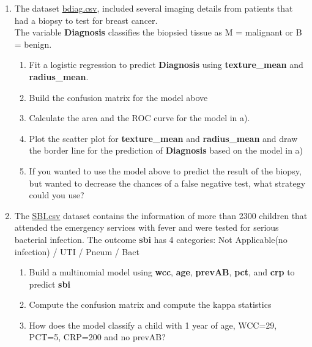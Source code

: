 \documentclass[
]{book}
\begin{document}
\begin{enumerate}
\def\labelenumi{\arabic{enumi})}
\item
  The dataset \href{https://www.dropbox.com/s/vp44yozebx5xgok/bdiag.csv?dl=1}{bdiag.csv},
  included several imaging details from patients that had a biopsy to test for
  breast cancer.\\
  The variable \textbf{Diagnosis} classifies the biopsied tissue as M = malignant or
  B = benign.

  \begin{enumerate}
  \def\labelenumii{\alph{enumii})}
  \item
    Fit a logistic regression to predict \textbf{Diagnosis} using \textbf{texture\_mean}
    and \textbf{radius\_mean}.
  \item
    Build the confusion matrix for the model above
  \item
    Calculate the area and the ROC curve for the model in a).
  \item
    Plot the scatter plot for \textbf{texture\_mean}
    and \textbf{radius\_mean} and draw the border line for the prediction of
    \textbf{Diagnosis} based on the model in a)
  \item
    If you wanted to use the model above to predict the result of the biopsy,
    but wanted to decrease the chances of a false negative test, what strategy
    could you use?
  \end{enumerate}
\item
  The \href{https://www.dropbox.com/s/da3by5vuzkv77xi/SBI.csv?dl=1}{SBI.csv} dataset
  contains the information of more than 2300 children that attended the
  emergency services with fever and were tested for serious bacterial infection.
  The outcome \textbf{sbi} has 4 categories: Not Applicable(no infection) / UTI / Pneum / Bact

  \begin{enumerate}
  \def\labelenumii{\alph{enumii})}
  \item
    Build a multinomial model using \textbf{wcc}, \textbf{age}, \textbf{prevAB}, \textbf{pct},
    and \textbf{crp} to predict \textbf{sbi}
  \item
    Compute the confusion matrix and compute the kappa statistics
  \item
    How does the model classify a child with 1 year of age, WCC=29,
    PCT=5, CRP=200 and no prevAB?
  \end{enumerate}
\end{enumerate}
\end{document}
